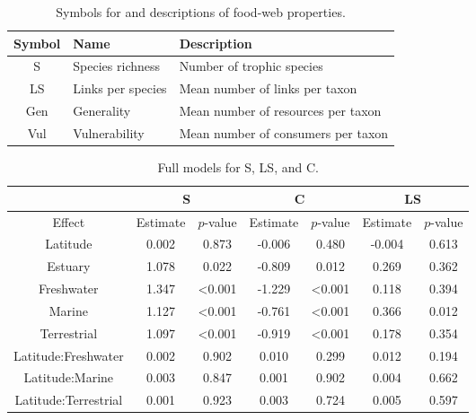\documentclass[12pt]{article}
\begin{document}
\begin{center}
\begin{table}[!h]
\caption{Symbols for and descriptions of food-web properties.}
\label{symboltable}
\begin{tabular}{c l l}
\hline
Symbol      & Name & Description \\
\hline
S & Species richness & Number of trophic species \\
LS & Links per species & Mean number of links per taxon \\
Gen & Generality & Mean number of resources per taxon \\
Vul & Vulnerability & Mean number of consumers per taxon \\
\hline
\end{tabular}
\end{table}
\end{center}

\begin{center}
\begin{table}[!h]
\caption{Full models for S, LS, and C.}
\label{symbols}
\begin{tabular}{c c c c c c c}
\hline
 & \multicolumn{2}{c}{S} & \multicolumn{2}{c}{C} & \multicolumn{2}{c}{LS} \\
\hline
Effect & Estimate & $p$-value & Estimate & $p$-value & Estimate & $p$-value \\
\hline
Latitude 			& 0.002  & 0.873  & -0.006 & 0.480  & -0.004 & 0.613 \\ 
Estuary 			& 1.078  & 0.022  & -0.809 & 0.012  & 0.269 & 0.362 \\
Freshwater 			& 1.347  & \textless0.001  & -1.229 & \textless0.001 & 0.118 & 0.394 \\
Marine 				& 1.127  & \textless0.001 & -0.761 & \textless0.001 & 0.366 & 0.012 \\
Terrestrial 		& 1.097  & \textless0.001 & -0.919 & \textless0.001 & 0.178 & 0.354\\
Latitude:Freshwater & 0.002  & 0.902  & 0.010  & 0.299  & 0.012 & 0.194\\
Latitude:Marine 	& 0.003  & 0.847  & 0.001  & 0.902  & 0.004 & 0.662 \\
Latitude:Terrestrial & 0.001 & 0.923  & 0.003  & 0.724  & 0.005 & 0.597 \\
\end{tabular}
\end{table}
\end{center}
\end{document}
